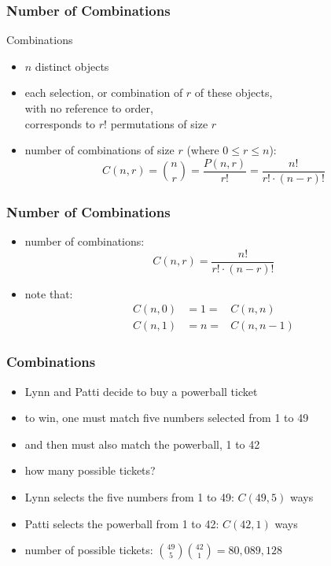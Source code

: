 \documentclass[dvipsnames]{beamer}
\begin{document}
\begin{frame}
  \frametitle{Number of Combinations}

  \begin{block}{Combinations}
    \begin{itemize}
      \item $n$ distinct objects
      \item each selection, or \alert{combination} of $r$ of these objects,\\
        with no reference to order,\\
        corresponds to $r!$ permutations of size $r$

      \pause
      \medskip
      \item number of combinations of size $r$ (where $0 \leq r \leq n$):
      \begin{equation*}
        C(n,r) = {n \choose r} = \frac{P(n,r)}{r!} = \frac{n!}{r! \cdot (n-r)!}
      \end{equation*}
    \end{itemize}
  \end{block}
\end{frame}

\begin{frame}
  \frametitle{Number of Combinations}

  \begin{itemize}
    \item number of combinations:
    \begin{equation*}
      C(n,r) = \frac{n!}{r! \cdot (n-r)!}
    \end{equation*}

    \item note that:
    \begin{eqnarray*}
      C(n,0) & = 1 = & C(n,n)\\
      C(n,1) & = n = & C(n,n-1)
    \end{eqnarray*}
  \end{itemize}
\end{frame}

\begin{frame}
  \frametitle{Combinations}
  
  \begin{example}
    \begin{itemize}
      \item Lynn and Patti decide to buy a powerball ticket
      \item to win, one must match five numbers selected from 1 to 49
      \item and then must also match the powerball, 1 to 42
      \item how many possible tickets?

      \pause
      \medskip
      \item Lynn selects the five numbers from 1 to 49: $C(49,5)$ ways
      \item Patti selects the powerball from 1 to 42: $C(42,1)$ ways
      \item number of possible tickets:
        ${49 \choose 5}{42 \choose 1} = 80,089,128$
    \end{itemize}
  \end{example}
\end{frame}
\end{document}

